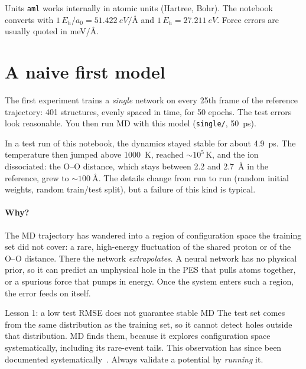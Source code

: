 \documentclass[11pt,a4paper]{article}
\begin{document}
\begin{warnbox}{Units}
\texttt{aml} works internally in atomic units (Hartree, Bohr). The notebook
converts with $1\,E_h/a_0 = \SI{51.422}{eV/\angstrom}$ and
$1\,E_h = \SI{27.211}{eV}$. Force errors are usually quoted in
\si{meV/\angstrom}.
\end{warnbox}

\section{A naive first model}

The first experiment trains a \emph{single} network on every 25th frame of the
reference trajectory: 401 structures, evenly spaced in time, for 50 epochs.
The test errors look reasonable. You then run MD with this model
(\texttt{single/}, \SI{50}{ps}).

In a test run of this notebook, the dynamics stayed stable for about
\SI{4.9}{ps}. The temperature then jumped above \SI{1000}{K}, reached
$\sim\!10^{5}\,$K, and the ion dissociated: the O--O distance, which stays
between 2.2 and \SI{2.7}{\angstrom} in the reference, grew to
$\sim\!\SI{100}{\angstrom}$. The details change from run to run (random
initial weights, random train/test split), but a failure of this kind is
typical.

\paragraph{Why?} The MD trajectory has wandered into a region of configuration
space the training set did not cover: a rare, high-energy fluctuation of the
shared proton or of the O--O distance. There the network \emph{extrapolates}.
A neural network has no physical prior, so it can predict an unphysical hole
in the PES that pulls atoms together, or a spurious force that pumps in
energy. Once the system enters such a region, the error feeds on itself.

\begin{keybox}{Lesson 1: a low test RMSE does not guarantee stable MD}
The test set comes from the same distribution as the training set, so it
cannot detect holes outside that distribution. MD finds them, because it
explores configuration space systematically, including its rare-event
tails. This observation has since been documented
systematically~\cite{Fu2022}. Always validate a potential by \emph{running}
it.
\end{keybox}
\end{document}
